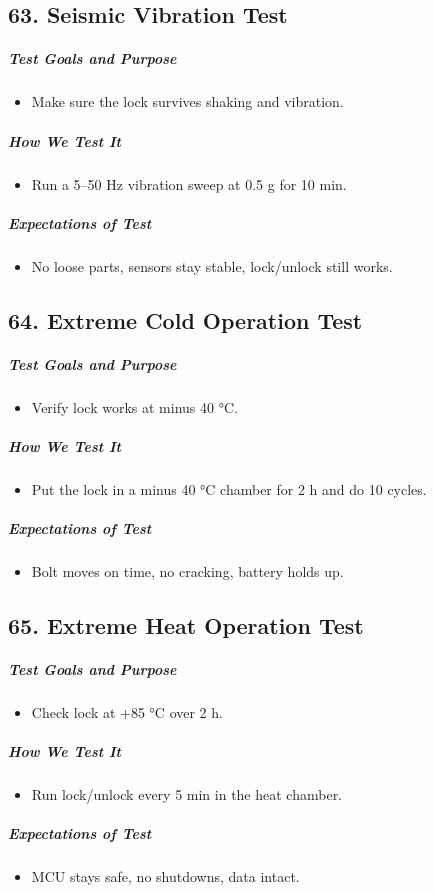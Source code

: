 \subsection*{63. Seismic Vibration Test}
\subparagraph{Test Goals and Purpose}
\begin{itemize}
    \item Make sure the lock survives shaking and vibration.
\end{itemize}
\subparagraph{How We Test It}
\begin{itemize}
    \item Run a 5–50 Hz vibration sweep at 0.5 g for 10 min.
\end{itemize}
\subparagraph{Expectations of Test}
\begin{itemize}
    \item No loose parts, sensors stay stable, lock/unlock still works.
\end{itemize}

\subsection*{64. Extreme Cold Operation Test}
\subparagraph{Test Goals and Purpose}
\begin{itemize}
    \item Verify lock works at minus 40 °C.
\end{itemize}
\subparagraph{How We Test It}
\begin{itemize}
    \item Put the lock in a minus 40 °C chamber for 2 h and do 10 cycles.
\end{itemize}
\subparagraph{Expectations of Test}
\begin{itemize}
    \item Bolt moves on time, no cracking, battery holds up.
\end{itemize}

\subsection*{65. Extreme Heat Operation Test}
\subparagraph{Test Goals and Purpose}
\begin{itemize}
    \item Check lock at +85 °C over 2 h.
\end{itemize}
\subparagraph{How We Test It}
\begin{itemize}
    \item Run lock/unlock every 5 min in the heat chamber.
\end{itemize}
\subparagraph{Expectations of Test}
\begin{itemize}
    \item MCU stays safe, no shutdowns, data intact.
\end{itemize}
